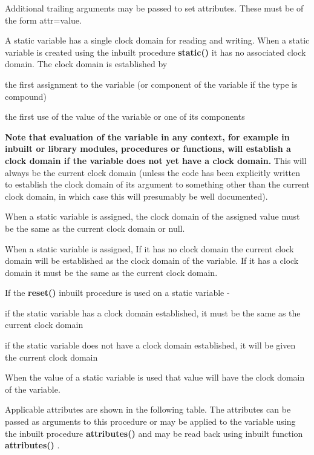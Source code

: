         Additional trailing arguments may be passed to set attributes. These
        must be of the form attr=value.
        
        A static variable has a single clock domain for reading and writing.
        When a static variable is created using the inbuilt procedure {\bf
        static()} it has no associated clock domain. The clock domain is
        established by
        \blist
        \item   the first assignment to the variable (or component of
                the variable if the type is compound)
        \item   the first use of the value
                of the variable or one of its components
        \blend
        
        {\bf Note that evaluation of the variable in any context, for example
        in inbuilt or library modules, procedures or functions, will establish
        a clock domain if the variable does not yet have a clock domain.}
        This will always be the current clock domain (unless the code has
        been explicitly written to establish the clock domain of its argument
        to something other than the current clock domain, in which case
        this will presumably be well documented).
        
        When a static variable is assigned, the clock domain of the assigned
        value must be the same as the current clock domain or null.
        
        When a static variable is assigned, If it has no clock domain the
        current clock domain will be established as the clock domain of the
        variable. If it has a clock domain it must be the same as the current
        clock domain.
        
        If the {\bf reset()} inbuilt procedure is used on a static variable -
        \blist
        \item   if the static variable has a clock domain established, it
                must be the same as the current clock domain
        \item   if the static variable does not have a clock domain established,
                it will be given the current clock domain
        \blend
        
        When the value of a static variable is used that value will have the
        clock domain of the variable.
        
        Applicable attributes are shown in the following table. The
        attributes can be passed as arguments to this procedure or may be
        applied to the variable using the inbuilt procedure
        {\bf attributes()}  and may be read back
        using inbuilt function {\bf attributes()} .
        
